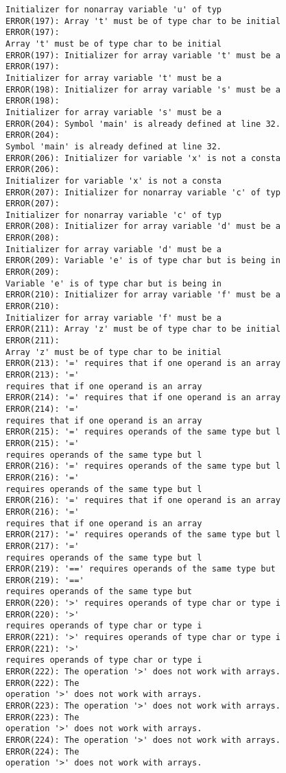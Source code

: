 \documentclass[12pt]{book}
\begin{document}
\begin{lstlisting}
Initializer for nonarray variable 'u' of typ
ERROR(197): Array 't' must be of type char to be initial    ERROR(197): 
Array 't' must be of type char to be initial
ERROR(197): Initializer for array variable 't' must be a    ERROR(197): 
Initializer for array variable 't' must be a
ERROR(198): Initializer for array variable 's' must be a    ERROR(198): 
Initializer for array variable 's' must be a
ERROR(204): Symbol 'main' is already defined at line 32.    ERROR(204): 
Symbol 'main' is already defined at line 32.
ERROR(206): Initializer for variable 'x' is not a consta    ERROR(206): 
Initializer for variable 'x' is not a consta
ERROR(207): Initializer for nonarray variable 'c' of typ    ERROR(207): 
Initializer for nonarray variable 'c' of typ
ERROR(208): Initializer for array variable 'd' must be a    ERROR(208): 
Initializer for array variable 'd' must be a
ERROR(209): Variable 'e' is of type char but is being in    ERROR(209): 
Variable 'e' is of type char but is being in
ERROR(210): Initializer for array variable 'f' must be a    ERROR(210): 
Initializer for array variable 'f' must be a
ERROR(211): Array 'z' must be of type char to be initial    ERROR(211): 
Array 'z' must be of type char to be initial
ERROR(213): '=' requires that if one operand is an array    ERROR(213): '=' 
requires that if one operand is an array
ERROR(214): '=' requires that if one operand is an array    ERROR(214): '=' 
requires that if one operand is an array
ERROR(215): '=' requires operands of the same type but l    ERROR(215): '=' 
requires operands of the same type but l
ERROR(216): '=' requires operands of the same type but l    ERROR(216): '=' 
requires operands of the same type but l
ERROR(216): '=' requires that if one operand is an array    ERROR(216): '=' 
requires that if one operand is an array
ERROR(217): '=' requires operands of the same type but l    ERROR(217): '=' 
requires operands of the same type but l
ERROR(219): '==' requires operands of the same type but     ERROR(219): '=='
requires operands of the same type but 
ERROR(220): '>' requires operands of type char or type i    ERROR(220): '>' 
requires operands of type char or type i
ERROR(221): '>' requires operands of type char or type i    ERROR(221): '>' 
requires operands of type char or type i
ERROR(222): The operation '>' does not work with arrays.    ERROR(222): The 
operation '>' does not work with arrays.
ERROR(223): The operation '>' does not work with arrays.    ERROR(223): The 
operation '>' does not work with arrays.
ERROR(224): The operation '>' does not work with arrays.    ERROR(224): The 
operation '>' does not work with arrays.

\end{lstlisting}
\end{document}

